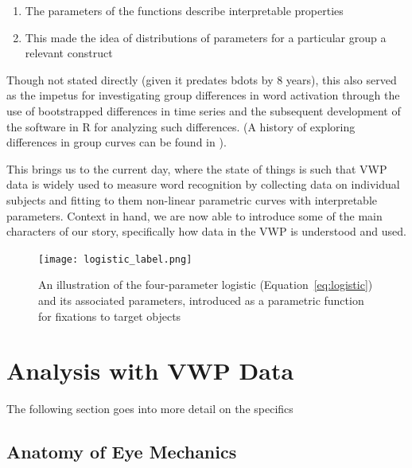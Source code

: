 \begin{singlespace}
\begin{enumerate}
\vspace{-3mm}
\item The parameters of the functions describe interpretable properties
\item This made the idea of distributions of parameters for a particular group a relevant construct
\end{enumerate}
\end{singlespace}

Though not stated directly (given it predates bdots by 8 years), this also served as the impetus for investigating group differences in word activation through the use of bootstrapped differences in time series \citep{oleson2017detecting} and the subsequent development of the  software in R for analyzing such differences. (A history of exploring differences in group curves can be found in \citet{seedorff2018bdots}).

This brings us to the current day, where the state of things is such that VWP data is widely used to measure word recognition by collecting data on individual subjects and fitting to them non-linear parametric curves with interpretable parameters. Context in hand, we are now able to introduce some of the main characters of our story, specifically how data in the VWP is understood and used. 



\begin{figure}[h]
\centering
\texttt{[image: logistic\_label.png]}
\caption{An illustration of the four-parameter logistic (Equation~\ref{eq:logistic}) and its associated parameters, introduced as a parametric function for fixations to target objects}
\label{fig:logistic_definition}
\end{figure}



\section{Analysis with VWP Data}

The following section goes into more detail on the specifics


\subsection{Anatomy of Eye Mechanics }

